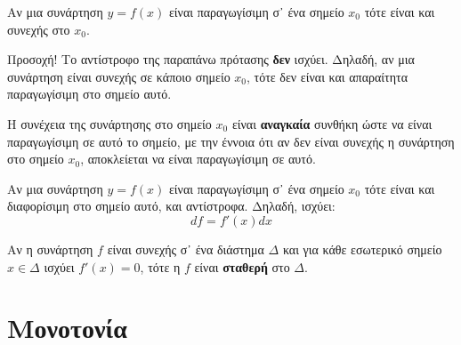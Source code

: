 

\begin{prop}
  Αν μια συνάρτηση $ y=f(x) $ είναι παραγωγίσιμη σ᾽ ένα σημείο $ x_{0} $ τότε είναι 
  και συνεχής στο $ x_{0} $.
\end{prop}

\begin{rem}
\item{}
  \begin{myitemize}
    \item Προσοχή! Το αντίστροφο της παραπάνω πρότασης \textbf{δεν} ισχύει. 
      Δηλαδή, αν μια συνάρτηση είναι συνεχής σε κάποιο σημείο $ x_{0} $, 
      τότε δεν είναι και απαραίτητα παραγωγίσιμη στο σημείο αυτό.
    \item Η συνέχεια της συνάρτησης στο σημείο $ x_{0} $ είναι \textbf{αναγκαία} 
      συνθήκη ώστε να είναι παραγωγίσιμη σε αυτό το σημείο, με την έννοια ότι 
      αν δεν είναι συνεχής η συνάρτηση στο σημείο $ x_{0} $, αποκλείεται να είναι 
      παραγωγίσιμη σε αυτό.
  \end{myitemize}
\end{rem}

\begin{prop}
  Αν μια συνάρτηση $ y=f(x) $ είναι παραγωγίσιμη σ᾽ ένα σημείο $ x_{0} $ τότε είναι 
  και διαφορίσιμη στο σημείο αυτό, και αντίστροφα. Δηλαδή, ισχύει:
  \[
    df  = f'(x) dx 
  \] 
\end{prop}

\begin{prop}
  Αν η συνάρτηση $f$ είναι συνεχής σ᾽ ένα διάστημα $\Delta$ και για κάθε εσωτερικό 
  σημείο $x \in \Delta$ ισχύει $ f'(x)=0 $, τότε η $f$ είναι \textbf{σταθερή} στο 
  $\Delta$. 
\end{prop}

\section*{Μονοτονία}

